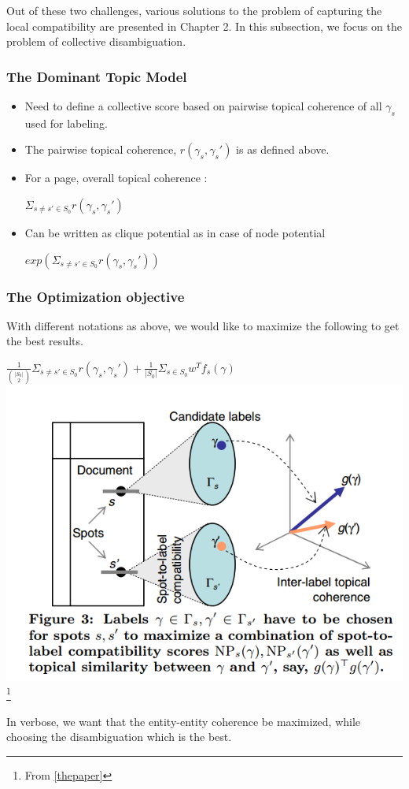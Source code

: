  Out of these two challenges, various solutions to the problem of capturing the local compatibility are presented in Chapter 2. 
 In this subsection, we focus on the problem of collective disambiguation. 
 
 \subsubsection{The Dominant Topic Model}
  \begin{itemize}
   \item Need to define a collective score based on pairwise topical coherence of all $\gamma_s$ used for labeling. \medskip
   \item The pairwise topical coherence, $r(\gamma_s, \gamma_s')$ is as defined above.\medskip
   \item For a page, overall topical coherence : \begin{center}\medskip
                                                  $\Sigma_{s \neq s' \in S_0}r(\gamma_s, \gamma_s')$
                                                 \end{center}
   \item Can be written as clique potential as in case of node potential\medskip
      \begin{center}
	$exp(\Sigma_{s \neq s' \in S_0}r(\gamma_s, \gamma_s'))$
      \end{center}

  \end{itemize}

  \subsubsection{The Optimization objective}
  With different notations as above, we would like to maximize the following to get the 
  best results.
 \begin{center}
 $\frac{1}{\binom{|S_0|}{2}}\Sigma_{s \neq s' \in S_0}r(\gamma_s, \gamma_s') + \frac{1}{|S_0|}\Sigma_{s \in S_0}w^{T}f_s(\gamma)$
  \\
  \includegraphics[height = 5 cm]{objective}\footnote{From \ref{thepaper}}
  \end{center}
  In verbose, we want that the entity-entity coherence be maximized, while choosing the disambiguation which is the best.

